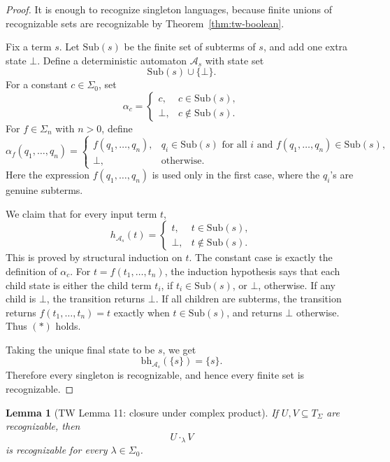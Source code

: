 \documentclass[11pt]{article}
\newtheorem{lemma}[theorem]{Lemma}
\theoremstyle{definition}
\newcommand{\SigmaSym}{\Sigma}
\newcommand{\Term}[1]{T_{#1}}
\newcommand{\Aut}{\mathcal A}
\newcommand{\bh}{\mathrm{bh}}
\begin{document}
\begin{proof}
It is enough to recognize singleton languages, because finite unions of
recognizable sets are recognizable by Theorem~\ref{thm:tw-boolean}.

Fix a term \(s\).  Let \(\mathrm{Sub}(s)\) be the finite set of subterms of
\(s\), and add one extra state \(\bot\).  Define a deterministic automaton
\(\Aut_s\) with state set
\[
  \mathrm{Sub}(s)\cup\{\bot\}.
\]
For a constant \(c\in\SigmaSym_0\), set
\[
  \alpha_c=
  \begin{cases}
    c, & c\in\mathrm{Sub}(s),\\
    \bot, & c\notin\mathrm{Sub}(s).
  \end{cases}
\]
For \(f\in\SigmaSym_n\) with \(n>0\), define
\[
  \alpha_f(q_1,\ldots,q_n)=
  \begin{cases}
    f(q_1,\ldots,q_n),
      & q_i\in\mathrm{Sub}(s)\text{ for all }i
        \text{ and }f(q_1,\ldots,q_n)\in\mathrm{Sub}(s),\\
    \bot, & \text{otherwise}.
  \end{cases}
\]
Here the expression \(f(q_1,\ldots,q_n)\) is used only in the first case, where
the \(q_i\)'s are genuine subterms.

We claim that for every input term \(t\),
\[
  h_{\Aut_s}(t)=
  \begin{cases}
    t, & t\in\mathrm{Sub}(s),\\
    \bot, & t\notin\mathrm{Sub}(s).
  \end{cases}        \tag{\(*\)}
\]
This is proved by structural induction on \(t\).  The constant case is exactly
the definition of \(\alpha_c\).  For \(t=f(t_1,\ldots,t_n)\), the induction
hypothesis says that each child state is either the child term \(t_i\), if
\(t_i\in\mathrm{Sub}(s)\), or \(\bot\), otherwise.  If any child is \(\bot\), the
transition returns \(\bot\).  If all children are subterms, the transition
returns \(f(t_1,\ldots,t_n)=t\) exactly when \(t\in\mathrm{Sub}(s)\), and returns
\(\bot\) otherwise.  Thus \((*)\) holds.

Taking the unique final state to be \(s\), we get
\[
  \bh_{\Aut_s}(\{s\})=\{s\}.
\]
Therefore every singleton is recognizable, and hence every finite set is
recognizable.
\end{proof}

\begin{lemma}[TW Lemma 11: closure under complex product]\label{lem:tw-complex-product}
If \(U,V\subseteq\Term{\SigmaSym}\) are recognizable, then
\[
  U\cdot_\lambda V
\]
is recognizable for every \(\lambda\in\SigmaSym_0\).
\end{lemma}
\end{document}
